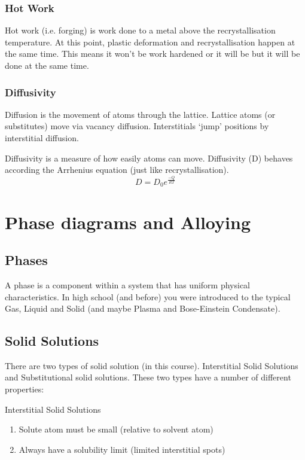 \documentclass[12pt]{article}
\begin{document}
\subsubsection{Hot Work}
Hot work (i.e. forging) is work done to a metal above the recrystallisation temperature.
At this point, plastic deformation and recrystallisation happen at the same time. 
This means it won't be work hardened or it will be but it will be done at the same time.

\subsubsection{Diffusivity}
Diffusion is the movement of atoms through the lattice.
Lattice atoms (or substitutes) move via vacancy diffusion.
Interstitials `jump' positions by interstitial diffusion.

Diffusivity is a measure of how easily atoms can move.
Diffusivity (D) behaves according the Arrhenius equation (just like recrystallisation).
\begin{equation*}
  D = D_0 e^{\frac{-Q}{RT}}
\end{equation*}

\section{Phase diagrams and Alloying}
\subsection{Phases}
A phase is a component within a system that has uniform physical characteristics. 
In high school (and before) you were introduced to the typical Gas, Liquid and Solid (and maybe Plasma and Bose-Einstein Condensate).

\subsection{Solid Solutions}
There are two types of solid solution (in this course). 
Interstitial Solid Solutions and Substitutional solid solutions.
These two types have a number of different properties:

Interstitial Solid Solutions 
\begin{enumerate}
  \item Solute atom must be small (relative to solvent atom)
  \item Always have a solubility limit (limited interstitial spots)
\end{enumerate}
\end{document}
